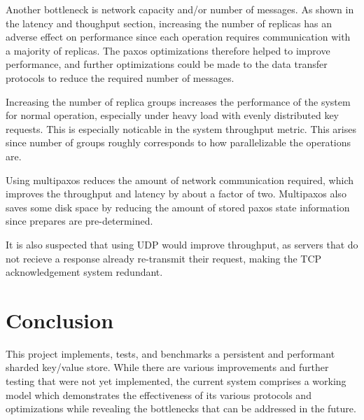 \documentclass[letterpaper,10pt]{article}
\begin{document}
Another bottleneck is network capacity and/or number of messages.  As shown in the latency and thoughput section, increasing the number of replicas has an adverse effect on performance since each operation requires communication with a majority of replicas.  The paxos optimizations therefore helped to improve performance, and further optimizations could be made to the data transfer protocols to reduce the required number of messages.

Increasing the number of replica groups increases the performance of the system for normal operation, especially under heavy load with evenly distributed key requests. This is especially noticable in the system throughput metric.  This arises since number of groups roughly corresponds to how parallelizable the operations are.

Using multipaxos reduces the amount of network communication required, which improves the throughput and latency by about a factor of two. Multipaxos also saves some disk space by reducing the amount of stored paxos state information since prepares are pre-determined.  

It is also suspected that using UDP would improve throughput, as servers that do not recieve a response already re-transmit their request, making the TCP acknowledgement system redundant.

\section{Conclusion}
This project implements, tests, and benchmarks a persistent and performant sharded key/value store.  While there are various improvements and further testing that were not yet implemented, the current system comprises a working model which demonstrates the effectiveness of its various protocols and optimizations while revealing the bottlenecks that can be addressed in the future.

\end{document}
